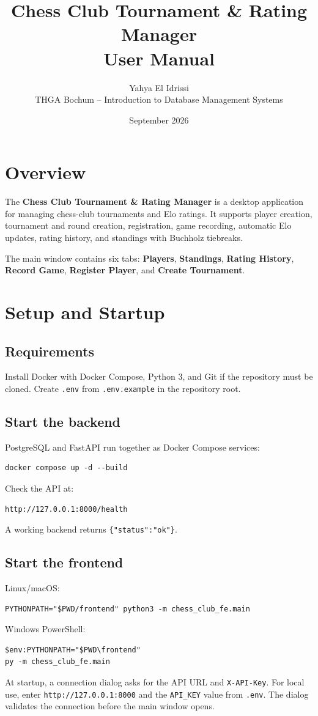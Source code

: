 \documentclass[11pt,a4paper]{article}
\title{Chess Club Tournament \& Rating Manager\\User Manual}
\author{Yahya El Idrissi\\THGA Bochum -- Introduction to Database Management Systems}
\date{September 2026}
\begin{document}
\maketitle
\tableofcontents
\newpage

\section{Overview}
The \textbf{Chess Club Tournament \& Rating Manager} is a desktop application for managing chess-club tournaments and Elo ratings. It supports player creation, tournament and round creation, registration, game recording, automatic Elo updates, rating history, and standings with Buchholz tiebreaks.

The main window contains six tabs: \textbf{Players}, \textbf{Standings}, \textbf{Rating History}, \textbf{Record Game}, \textbf{Register Player}, and \textbf{Create Tournament}.

\section{Setup and Startup}
\subsection{Requirements}
Install Docker with Docker Compose, Python 3, and Git if the repository must be cloned. Create \texttt{.env} from \texttt{.env.example} in the repository root.

\subsection{Start the backend}
PostgreSQL and FastAPI run together as Docker Compose services:
\begin{verbatim}
docker compose up -d --build
\end{verbatim}
Check the API at:
\begin{verbatim}
http://127.0.0.1:8000/health
\end{verbatim}
A working backend returns \texttt{\{"status":"ok"\}}.

\subsection{Start the frontend}
Linux/macOS:
\begin{verbatim}
PYTHONPATH="$PWD/frontend" python3 -m chess_club_fe.main
\end{verbatim}
Windows PowerShell:
\begin{verbatim}
$env:PYTHONPATH="$PWD\frontend"
py -m chess_club_fe.main
\end{verbatim}
At startup, a connection dialog asks for the API URL and \texttt{X-API-Key}. For local use, enter \texttt{http://127.0.0.1:8000} and the \texttt{API\_KEY} value from \texttt{.env}. The dialog validates the connection before the main window opens.
\end{document}
